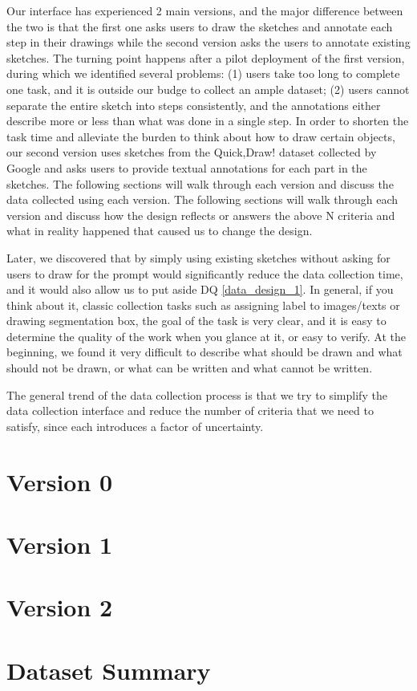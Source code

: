 
Our interface has experienced 2 main versions, and the major difference between the two is that the first one asks users to draw the sketches and annotate each step in their drawings while the second version asks the users to annotate existing sketches. The turning point happens after a pilot deployment of the first version, during which we identified several problems: (1) users take too long to complete one task, and it is outside our budge to collect an ample dataset; (2) users cannot separate the entire sketch into steps consistently, and the annotations either describe more or less than what was done in a single step. In order to shorten the task time and alleviate the burden to think about how to draw certain objects, our second version uses sketches from the Quick,Draw! dataset collected by Google and asks users to provide textual annotations for each part in the sketches. The following sections will walk through each version and discuss the data collected using each version. The following sections will walk through each version and discuss how the design reflects or answers the above N criteria and what in reality happened that caused us to change the design.  

Later, we discovered that by simply using existing sketches without asking for users to draw for the prompt would significantly reduce the data collection time, and it would also allow us to put aside DQ \ref{data_design_1}. In general, if you think about it, classic collection tasks such as assigning label to images/texts or drawing segmentation box, the goal of the task is very clear, and it is easy to determine the quality of the work when you glance at it, or easy to verify. At the beginning, we found it very difficult to describe what should be drawn and what should not be drawn, or what can be written and what cannot be written. 

The general trend of the data collection process is that we try to simplify the data collection interface and reduce the number of criteria that we need to satisfy, since each introduces a factor of uncertainty.   

\section{Version 0}



\section{Version 1}


\section{Version 2}


\section{Dataset Summary}
